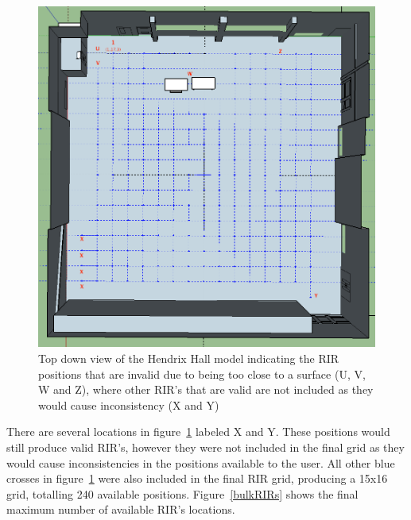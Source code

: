 \documentclass[../../main.tex]{subfiles}
\begin{document}
			\begin{figure}
				\centerline{\includegraphics[width=\textwidth]{Sections/Implementation/Odeon/images/RIRPositions/RIRPositionAnnotated.png}}
				\caption{Top down view of the Hendrix Hall model indicating the \ac{RIR} positions that are invalid due to being too close to a surface (U, V, W and Z), where other \ac{RIR}'s that are valid are not included as they would cause inconsistency (X and Y)}
				\label{incorrectRIRPositions}
			\end{figure}



			There are several locations in figure~\ref{incorrectRIRPositions} labeled X and Y. These positions would still produce valid \ac{RIR}'s, however they were not included in the final grid as they would cause inconsistencies in the positions available to the user. All other blue crosses in figure~\ref{incorrectRIRPositions} were also included in the final \ac{RIR} grid, producing a 15x16 grid, totalling 240 available positions. Figure~\ref{bulkRIRs} shows the final maximum number of available \ac{RIR}'s locations.
\end{document}
